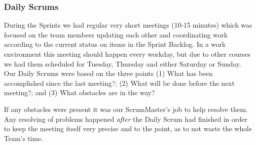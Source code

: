 \subsubsection{Daily Scrums}
During the Sprints we had regular very short meetings (10-15 minutes) which was focused on the team members updating each other and coordinating work according to the current status on items in the Sprint Backlog. In a work environment this meeting should happen every workday, but due to other courses we had them scheduled for Tuesday, Thursday and either Saturday or Sunday. Our Daily Scrums were based on the three points (1) What has been accomplished since the last meeting?; (2) What will be done before the next meeting?; and (3) What obstacles are in the way?

If any obstacles were present it was our ScrumMaster's job to help resolve them. Any resolving of problems happened \emph{after} the Daily Scrum had finished in order to keep the meeting itself very precise and to the point, as to not waste the whole Team's time.